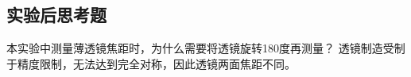 \documentclass[dvipsnames, svgnames,a4paper,11pt]{article}
\begin{document}
\subsection{实验后思考题}
\begin{question}
	本实验中测量薄透镜焦距时，为什么需要将透镜旋转180度再测量？
	\tcblower
	透镜制造受制于精度限制，无法达到完全对称，因此透镜两面焦距不同。
\end{question}
\clearpage
%
%


\appendix
\appendixpage
\addappheadtotoc
%
\end{document}
